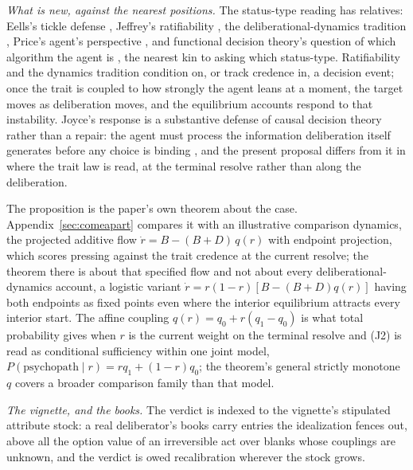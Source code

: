 \noindent\emph{What is new, against the nearest positions.} The status-type reading has relatives: Eells's tickle defense \cite{eells1982rational}, Jeffrey's ratifiability \cite{jeffrey1983logic}, the deliberational-dynamics tradition \cite{skyrms1990dynamics, arntzenius2008no, joyce2012regret}, Price's agent's perspective \cite{price2012causation}, and functional decision theory's question of which algorithm the agent is \cite{soares2017fdt}, the nearest kin to asking which status-type. Ratifiability and the dynamics tradition condition on, or track credence in, a decision event; once the trait is coupled to how strongly the agent leans at a moment, the target moves as deliberation moves, and the equilibrium accounts respond to that instability. Joyce's response is a substantive defense of causal decision theory rather than a repair: the agent must process the information deliberation itself generates before any choice is binding \cite{joyce2012regret}, and the present proposal differs from it in where the trait law is read, at the terminal resolve rather than along the deliberation.

\noindent The proposition is the paper's own theorem about the case. Appendix~\ref{sec:comeapart} compares it with an illustrative comparison dynamics, the projected additive flow $\dot r = B - (B+D)\,q(r)$ with endpoint projection, which scores pressing against the trait credence at the current resolve; the theorem there is about that specified flow and not about every deliberational-dynamics account, a logistic variant $\dot r = r(1-r)[B - (B+D)q(r)]$ having both endpoints as fixed points even where the interior equilibrium attracts every interior start. The affine coupling $q(r) = q_0 + r(q_1 - q_0)$ is what total probability gives when $r$ is the current weight on the terminal resolve and (J2) is read as conditional sufficiency within one joint model, $P(\text{psychopath} \mid r) = r q_1 + (1 - r) q_0$; the theorem's general strictly monotone $q$ covers a broader comparison family than that model.

\noindent\emph{The vignette, and the books.} The verdict is indexed to the vignette's stipulated attribute stock: a real deliberator's books carry entries the idealization fences out, above all the option value of an irreversible act over blanks whose couplings are unknown, and the verdict is owed recalibration wherever the stock grows.

